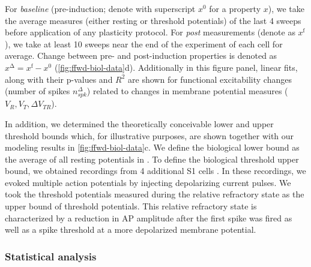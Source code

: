 For \textit{baseline} (pre-induction; denote with superscript $x^{\mathrm{0}}$ for a property $x$),
        we take the average measures (either resting or threshold potentials)
        of the last 4 sweeps before application of any plasticity protocol.
    For \textit{post} measurements (denote as $x^{\mathrm{f}}$),
        we take at least 10 sweeps near the end of the experiment of each cell for average.
    Change between pre- and post-induction properties is denoted as
        $x^{\mathrm{\Delta}} = x^{\mathrm{f}} - x^{\mathrm{0}}$
        (\autoref{fig:ffwd-biol-data}d).
    Additionally in this figure panel, linear fits, along with their p-values and $R^2$
        are shown for functional excitability changes
        (number of spikes $n_{spk}^{\Delta}$)
        related to changes in membrane potential measures ($V_R, V_T, \Delta V_{TR}$).

In addition, we determined the theoretically conceivable lower and upper threshold bounds
        which, for illustrative purposes, are shown together
        with our modeling results in \autoref{fig:ffwd-biol-data}c.
    We define the biological lower bound
        as the average of all resting potentials in \cite{Gill2020-wy}.
    To define the biological threshold upper bound,
        we obtained recordings from 4 additional S1 cells
        \citep[same recording conditions as in][]{Gill2020-wy}.
    In these recordings, we evoked multiple action potentials
        by injecting depolarizing current pulses.
    We took the threshold potentials measured
        during the relative refractory state
        as the upper bound of threshold potentials.
    This relative refractory state is characterized
        by a reduction in AP amplitude after the first spike was fired
        as well as a spike threshold at a more depolarized membrane potential.


\subsubsection{Statistical analysis}



